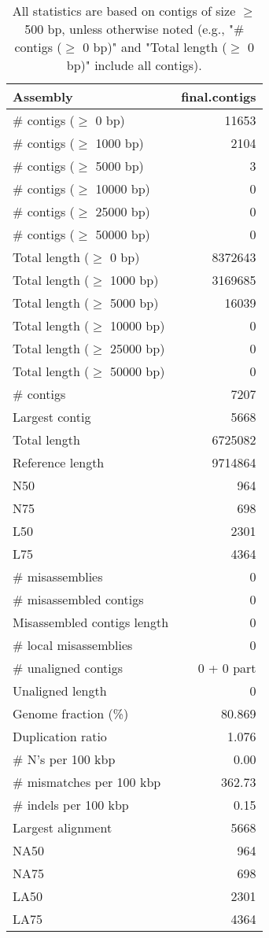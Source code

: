 \documentclass[12pt,a4paper]{article}
\begin{document}
\begin{table}[ht]
\begin{center}
\caption{All statistics are based on contigs of size $\geq$ 500 bp, unless otherwise noted (e.g., "\# contigs ($\geq$ 0 bp)" and "Total length ($\geq$ 0 bp)" include all contigs).}
\begin{tabular}{|l*{1}{|r}|}
\hline
Assembly & final.contigs \\ \hline
\# contigs ($\geq$ 0 bp) & 11653 \\ \hline
\# contigs ($\geq$ 1000 bp) & 2104 \\ \hline
\# contigs ($\geq$ 5000 bp) & 3 \\ \hline
\# contigs ($\geq$ 10000 bp) & 0 \\ \hline
\# contigs ($\geq$ 25000 bp) & 0 \\ \hline
\# contigs ($\geq$ 50000 bp) & 0 \\ \hline
Total length ($\geq$ 0 bp) & 8372643 \\ \hline
Total length ($\geq$ 1000 bp) & 3169685 \\ \hline
Total length ($\geq$ 5000 bp) & 16039 \\ \hline
Total length ($\geq$ 10000 bp) & 0 \\ \hline
Total length ($\geq$ 25000 bp) & 0 \\ \hline
Total length ($\geq$ 50000 bp) & 0 \\ \hline
\# contigs & 7207 \\ \hline
Largest contig & 5668 \\ \hline
Total length & 6725082 \\ \hline
Reference length & 9714864 \\ \hline
N50 & 964 \\ \hline
N75 & 698 \\ \hline
L50 & 2301 \\ \hline
L75 & 4364 \\ \hline
\# misassemblies & 0 \\ \hline
\# misassembled contigs & 0 \\ \hline
Misassembled contigs length & 0 \\ \hline
\# local misassemblies & 0 \\ \hline
\# unaligned contigs & 0 + 0 part \\ \hline
Unaligned length & 0 \\ \hline
Genome fraction (\%) & 80.869 \\ \hline
Duplication ratio & 1.076 \\ \hline
\# N's per 100 kbp & 0.00 \\ \hline
\# mismatches per 100 kbp & 362.73 \\ \hline
\# indels per 100 kbp & 0.15 \\ \hline
Largest alignment & 5668 \\ \hline
NA50 & 964 \\ \hline
NA75 & 698 \\ \hline
LA50 & 2301 \\ \hline
LA75 & 4364 \\ \hline
\end{tabular}
\end{center}
\end{table}
\end{document}
